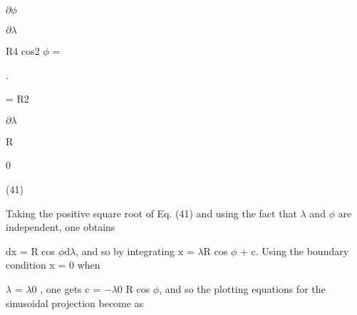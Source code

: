 \documentclass[a4paper,portrait,12pt]{article}
\begin{document}
\newpage



\newpage



\begin{flushleft}
$\partial$$\phi$
\end{flushleft}


\begin{flushleft}
$\partial$$\lambda$
\end{flushleft}


\begin{flushleft}
R4 cos2 $\phi$ = \newpage

\end{flushleft}


.


\begin{flushleft}
\newpage
 = R2
\end{flushleft}


\newpage



\newpage



\begin{flushleft}
$\partial$$\lambda$
\end{flushleft}


\begin{flushleft}
\newpage
R
\end{flushleft}


\newpage



0





(41)





\begin{flushleft}
Taking the positive square root of Eq. (41) and using the fact that $\lambda$ and $\phi$ are independent, one obtains
\end{flushleft}


\begin{flushleft}
dx = R cos $\phi$d$\lambda$, and so by integrating x = $\lambda$R cos $\phi$ + c. Using the boundary condition x = 0 when
\end{flushleft}


\begin{flushleft}
$\lambda$ = $\lambda$0 , one gets c = $-$$\lambda$0 R cos $\phi$, and so the plotting equations for the sinusoidal projection become as
\end{flushleft}
\end{document}
